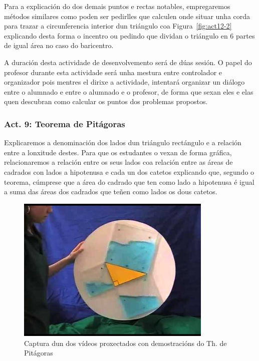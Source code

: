 Para a explicación do dos demais puntos e rectas notables, empregaremos métodos similares como poden ser pedirlles que calculen onde situar unha corda para trazar a circunferencia interior dun triángulo coa Figura~\ref{fig:act12-2} explicando desta forma o incentro ou pedindo que dividan o triángulo en 6 partes de igual área no caso do baricentro.

A duración desta actividade de desenvolvemento será de dúas sesión. O papel do profesor durante esta actividade será unha mestura entre controlador e organizador pois mentres el dirixe a actividade, intentará organizar un diálogo entre o alumnado e entre o alumnado e o profesor, de forma que sexan eles e elas quen descubran como calcular os puntos dos problemas propostos.

\subsubsection{Act. 9: Teorema de Pitágoras}\label{act:pitagoras}
Explicaremos a denominación dos lados dun triángulo rectángulo e a relación entre a lonxitude destes. Para que os estudantes o vexan de forma gráfica, relacionaremos a relación entre os seus lados coa relación entre as áreas de cadrados con lados a hipotenusa e cada un dos catetos explicando que, segundo o teorema, cúmprese que a área do cadrado  que ten como lado a hipotenusa é igual a suma das áreas dos cadrados que teñen como lados os dous catetos.

\begin{figure}[h!]
  \centering
  \includegraphics[height=7cm]{img/pitagoras.jpg}
  \caption{Captura dun dos vídeos proxectados con demostracións do Th. de Pitágoras}\label{fig:act10}
\end{figure}

